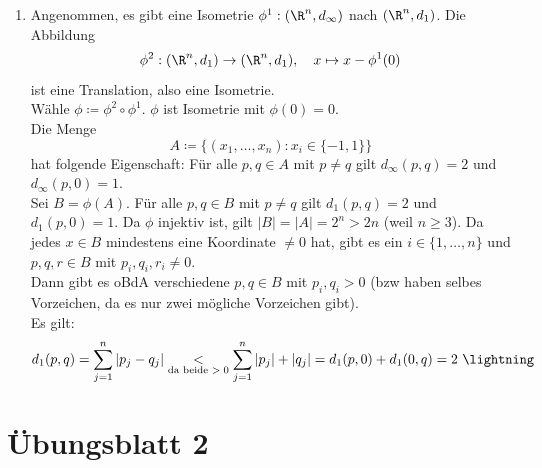 \begin{solution}
\begin{enumerate}[label=(\alph*)]
    \item Angenommen, es gibt eine Isometrie \( \phi^1: (\R^n, d_\infty) \) nach \( (\R^n, d_1) \). Die Abbildung
    \begin{equation*}
      \phi^2 : (\R^n, d_1) \to (\R^n, d_1), \quad x \mapsto x - \phi^1(0)
    \end{equation*}
    ist eine Translation, also eine Isometrie. \\
    Wähle \( \phi \coloneqq \phi^2 \circ \phi^1 \). \( \phi \) ist Isometrie mit \( \phi(0) = 0 \). \\
    Die Menge
    \begin{equation*}
      A \coloneqq \{ (x_1, \dots, x_n): x_i \in \{ -1, 1 \} \}
    \end{equation*}
    hat folgende Eigenschaft: Für alle \( p, q \in A \) mit \( p \neq q \) gilt \( d_\infty(p,q) = 2 \) und \( d_\infty(p, 0) = 1 \). \\
    Sei \( B = \phi(A) \). Für alle \( p,q \in B \) mit \( p \neq q \) gilt \( d_1(p,q) = 2 \) und \( d_1(p,0) = 1 \). Da \( \phi \) injektiv ist, gilt \( \vert B \vert = \vert A \vert = 2^n > 2n \) (weil \( n \geq 3 \)). Da jedes \( x \in B \) mindestens eine Koordinate \( \neq 0 \) hat, gibt es ein \( i \in \{ 1, \dots, n \} \) und \( p,q,r \in B \) mit \( p_i, q_i, r_i \neq 0 \). \\
    Dann gibt es oBdA verschiedene \( p,q \in B \) mit \( p_i, q_i > 0 \) (bzw haben selbes Vorzeichen, da es nur zwei mögliche Vorzeichen gibt). \\
    Es gilt:
    \begin{equation*}
      d_1(p,q) = \sum_{j = 1}^n \vert p_j - q_j \vert \underset{\text{da beide \( > 0 \)}}{<} \sum_{j = 1}^n \vert p_j \vert + \vert q_j \vert = d_1(p,0) + d_1(0,q) = 2 \ \lightning
    \end{equation*}
  \end{enumerate}
\end{solution}



% 
\section{Übungsblatt 2}
\setcounter{problemcounter}{0}

